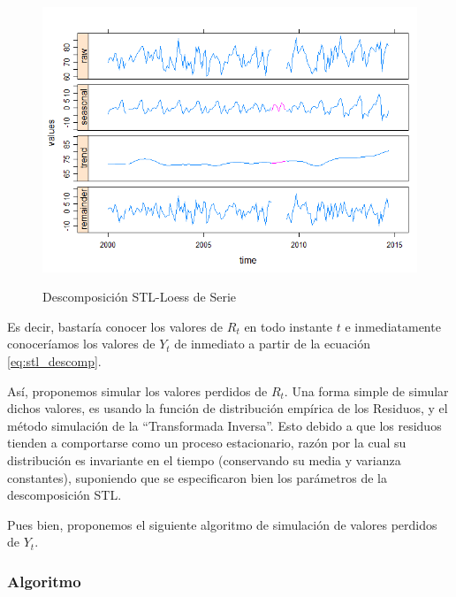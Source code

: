 \documentclass[12pt,oneside]{book}\usepackage[]{graphicx}\usepackage[]{color}
\theoremstyle{definition} %
\begin{document}
\begin{figure}[h]
\caption{Descomposición STL-Loess de Serie}
\includegraphics[width=15cm]{Cap2-Stl-Loess.png}
\label{fig:stl_descomp}
\centering
\end{figure}

Es decir, bastaría conocer los valores de $R_t$ en todo instante $t$ e inmediatamente conoceríamos los valores de $Y_t$ de inmediato a partir de la ecuación \eqref{eq:stl_descomp}.


Así, proponemos simular los valores perdidos de $R_t$. Una forma simple de simular dichos valores, es usando la función de distribución empírica de los Residuos, y el método simulación de la ``Transformada Inversa''. Esto debido a que los residuos tienden a comportarse como un proceso estacionario, razón por la cual su distribución es invariante en el tiempo (conservando su media y varianza constantes), suponiendo que se especificaron bien los parámetros de la descomposición STL.


Pues bien, proponemos el siguiente algoritmo de simulación de valores perdidos de $Y_t$.

\subsubsection{Algoritmo}
\end{document}
